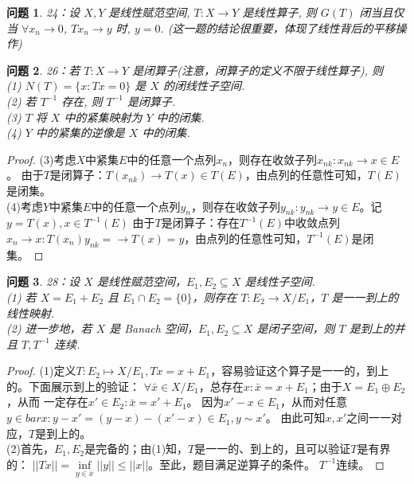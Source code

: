 \documentclass[a4paper, 12pt]{ctexart}
\newtheorem*{theorem}{问题}%
\begin{document}
\begin{theorem}
24：设 $X, Y$ 是线性赋范空间, $T: X \rightarrow Y$ 是线性算子, 则 $G(T)$ 闭当且仅当 $\forall x_n \to 0$, $Tx_n \to y$ 时, $y = 0$.
(这一题的结论很重要，体现了线性背后的平移操作)
\end{theorem}

\begin{theorem}
26：若 $T: X \rightarrow Y$ 是闭算子(注意，闭算子的定义不限于线性算子), 则\\
(1) $N(T) = \{ x : Tx = 0\}$ 是 $X$ 的闭线性子空间.\\
(2) 若 $T^{-1}$ 存在, 则 $T^{-1}$ 是闭算子.\\
(3) $T$ 将 $X$ 中的紧集映射为 $Y$ 中的闭集.\\
(4) $Y$ 中的紧集的逆像是 $X$ 中的闭集.
\end{theorem}

\begin{proof}
(3)考虑$X$中紧集$E$中的任意一个点列$x_n$，则存在收敛子列$x_{nk}:x_{nk}\to x\in E$。
由于$T$是闭算子：$T(x_{nk})\to T(x) \in T(E)$，由点列的任意性可知，$T(E)$是闭集。
\\
(4)考虑$Y$中紧集$E$中的任意一个点列$y_n$，则存在收敛子列$y_{nk}:y_{nk}\to y\in E$。记$y=T(x),x \in T^{-1}(E)$
由于$T$是闭算子：存在$T^{-1}(E)$中收敛点列$x_n \to x:T(x_n)y_{nk}=\to T(x)=y$，由点列的任意性可知，$T^{-1}(E)$是闭集。
\end{proof}

\begin{theorem}
28：设 $X$ 是线性赋范空间，$E_1, E_2 \subseteq X$ 是线性子空间.
\\
(1) 若 $X = E_1 + E_2$ 且 $E_1 \cap E_2 = \{0\}$，则存在 $T: E_2 \rightarrow X/E_1$，$T$ 是一一到上的线性映射.
\\
(2) 进一步地，若 $X$ 是 Banach 空间，$E_1, E_2 \subseteq X$ 是闭子空间，则 $T$ 是到上的并且 $T, T^{-1}$ 连续.
\end{theorem}
\begin{proof}
(1)定义$T:E_2\mapsto X/E_1,Tx=x+E_1$，容易验证这个算子是一一的，到上的。下面展示到上的验证：
$\forall \bar{x}\in X/E_1$，总存在$x:\bar{x}=x+E_1$；由于$X=E_1\oplus E_2$，从而
一定存在$x' \in E_2:\bar{x}=x'+E_1$。
因为$x'-x \in E_1$，从而对任意$y \in bar{x}:y-x'=(y-x)-(x'-x)\in E_1,y \sim x'$。
由此可知$x,x'$之间一一对应，$T$是到上的。
\\
(2)首先，$E_1,E_2$是完备的；由(1)知，$T$是一一的、到上的，且可以验证$T$是有界的：
$||Tx||=\underset{y\in \bar{x}}{\inf}||y||\leq ||x||$。至此，题目满足逆算子的条件。
$T^{-1}$连续。
\end{proof}
\end{document}

